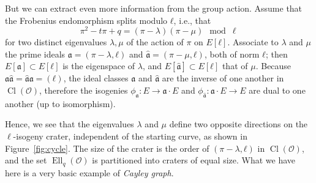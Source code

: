 \documentclass[10pt]{article}
\theoremstyle{plain}
\theoremstyle{definition}
\DeclareMathOperator{\Cl}{Cl}
\DeclareMathOperator{\Ell}{Ell}
\def\O{\ensuremath{\mathcal{O}}}
\def\a{\ensuremath{\mathfrak{a}}}
\begin{document}
But we can extract even more information from the group action. %
Assume that the Frobenius endomorphism splits modulo $ℓ$, i.e., that
\[π^2 - tπ + q = (π - λ)(π - μ) \mod\ell\] %
for two distinct eigenvalues $λ,μ$ of the action of $π$ on $E[ℓ]$. %
Associate to $λ$ and $μ$ the prime ideals $\a=(π-λ,ℓ)$ and
$\hat{\a}=(π-μ,ℓ)$, both of norm $ℓ$; then $E[\a]⊂E[ℓ]$ is the
eigenspace of $λ$, and $E[\hat{\a}]⊂E[ℓ]$ that of $μ$. %
Because $\a\hat{\a} = \hat{\a}\a = (ℓ)$, the ideal classes $\a$ and
$\hat{\a}$ are the inverse of one another in $\Cl(\O)$, therefore the
isogenies $ϕ_{\a}:E→\a·E$ and $ϕ_{\hat{\a}}:\a·E→E$ are dual to one
another (up to isomorphism). %

Hence, we see that the eigenvalues $λ$ and $μ$ define two opposite
directions on the $\ell$-isogeny crater, independent of the starting
curve, as shown in Figure~\ref{fig:cycle}. %
The size of the crater is the order of $(π-λ,ℓ)$ in $\Cl(\O)$, and the
set $\Ell_q(\O)$ is partitioned into craters of equal size. %
What we have here is a very basic example of \emph{Cayley graph}.
\end{document}

